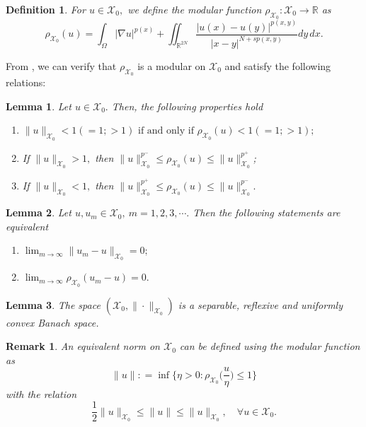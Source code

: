 \documentclass[11pt]{article}
\newtheorem{lemma}{Lemma}[section] %
\newtheorem{definition}{Definition}[section] %
\newtheorem{remark}{Remark}[section]
\newcommand{\R}{\mathbb{R}}
\newcommand{\X}{\mathcal{X}_{0}}
\newcommand{\rh}{\rho_{\X}}
\newcommand{\om} {\Omega}
\newcommand{\na} {\nabla}
\newcommand{\ra} {\rightarrow}
\newcommand{\lv}{\lVert}
\newcommand{\rv}{\rVert}
\begin{document}
\begin{definition}
    For $u\in\X,$
we define the modular function $\rho_{\X}:\X\to \R$
as
$$
    \rho_{\X}(u) = 
\int_\om|\na u|^{p(x)}+\iint_{\R^{2N}} 
\frac{|u(x) - u(y)|^{p(x,y)}}
{|x-y|^{N + s p(x,y)}} dy \, dx.
$$
\end{definition}

From
\cite[Definition 2.1.1]{Variable_book}, 
we can verify that $\rho_{\X}$
is a modular on $\X$
and satisfy the following relations:

\begin{lemma}
	Let $u \in \X.$
Then, the following properties hold
	\begin{enumerate}
		
\item[(i)]$
\lv u \rv_{\X}<1(=1;>1) \text{ if and only if }
 \rho_{\X}(u)<1(=1;>1);$
		
\item[(ii)] If $\lv u \rv_{\X}>1,$
then $\lv u \rv_{\X} ^{p^{-}}\leq\rho_{\X}(u)
\leq\lv u \rv_{\X}^{p^+}$;

\item[(iii)] If $\lv u \rv_{\X}<1,$
then $\lv u \rv_{\X}^{p^{+}}\leq\rho_{\X}(u)
\leq\lv u \rv_{\X}^{p^{-}}.$
	\end{enumerate}
\end{lemma}

\begin{lemma}\label{lem:modular_cgs_prob}
	Let 
$u,u_{m}  \in \X,~m=1,2,3,\cdots .$
Then the following statements are 
equivalent
	\begin{enumerate}

\item[(i)] $\displaystyle{\lim_{m\ra \infty} }\lv
 u_{m} - u \rv_{\X} =0;$

\item[(ii)] $\displaystyle{\lim_{m\ra \infty}}
 \rho_{\X}(u_{m} -u)=0.$
	\end{enumerate}
\end{lemma}

\begin{lemma}
    The space $(\X,\|\cdot\|_{\X})$
is a separable, reflexive and uniformly 
convex Banach space.
\end{lemma}


\begin{remark}\rm
    An equivalent norm on $\X$
can be defined using the modular function as
   \begin{equation*}
    \lv u \rv: = \inf
\Big \{ \eta > 0  : \rh
\Big (
\frac{u}{\eta}
\Big ) \le 1 
\Big \}
\end{equation*}
    with the relation 
    $$
\frac{1}{2}\|u\|_{\X}\le \|u\|\le\|u\|_{\X},
 \quad \forall u\in\X.$$
\end{remark}
\end{document}
